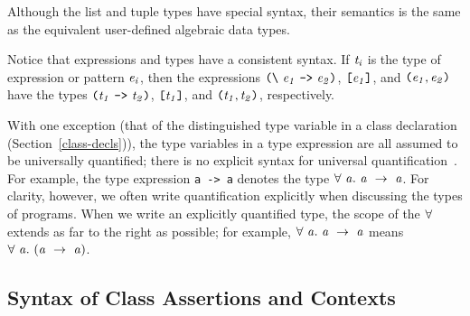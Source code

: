 Although the list and tuple types have special syntax, their semantics 
is the same as the equivalent user-defined algebraic data types.

Notice that expressions and types have a consistent syntax.
If \mbox{$\it t_i$} is the type of
expression or pattern \mbox{$\it e_i$}, then the expressions \mbox{$\it \makebox{\tt ({\char'134}}\ e_1\ \makebox{\tt ->}\ e_2\makebox{\tt )}$},
\mbox{$\it \makebox{\tt [}e_1\makebox{\tt ]}$}, and \mbox{$\it \makebox{\tt (}e_1,e_2\makebox{\tt )}$} have the types \mbox{$\it \makebox{\tt (}t_1\ \makebox{\tt ->}\ t_2\makebox{\tt )}$},
\mbox{$\it \makebox{\tt [}t_1\makebox{\tt ]}$}, and \mbox{$\it \makebox{\tt (}t_1,t_2\makebox{\tt )}$}, respectively.

With one exception (that of the distinguished type variable
in a class declaration (Section~\ref{class-decls})), the
type variables in a \Haskell{} type expression
are all assumed to be universally quantified; there is no explicit
syntax for universal quantification~\cite{damas-milner82}.
For example, the type expression
\mbox{\tt a\ ->\ a} denotes the type \mbox{$\it \forall\ a.~a\ \rightarrow\ a$}.
For clarity, however, we often write quantification explicitly
when discussing the types of \Haskell{} programs.  When we write an
explicitly quantified type, the scope of the \mbox{$\it \forall$} extends as far
to the right as possible; for example, \mbox{$\it \forall\ a.~a\ \rightarrow\ a$} means
\mbox{$\it \forall\ a.~(a\ \rightarrow\ a)$}.


\subsection{Syntax of Class Assertions and Contexts}
\label{classes&contexts}

